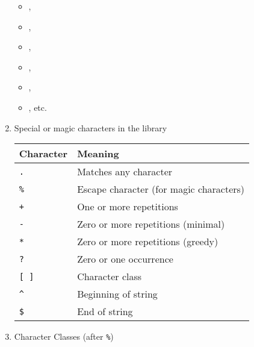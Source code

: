 \begin{enumerate}[label=(\alph*)]
\begin{itemize}

\item {},
\item {},

\item {},

\item {},

\item {},

\item {}, etc.
\end{itemize}



\item Special or magic characters in the library \\

\begin{center}
  \begin{tabular}{@{}ll@{}}
  \toprule
  \textbf{Character} & \textbf{Meaning} \\
  \midrule
  \texttt{.} & Matches any character \\
  \texttt{\%} & Escape character (for magic characters) \\
  \texttt{+} & One or more repetitions \\
  \texttt{-} & Zero or more repetitions (minimal) \\
  \texttt{*} & Zero or more repetitions (greedy) \\
  \texttt{?} & Zero or one occurrence \\
  \texttt{[ ]} & Character class \\
  \texttt{\^{}} & Beginning of string \\
  \texttt{\$} & End of string \\
  \bottomrule
  \end{tabular}
\end{center}


\item Character Classes (after \texttt{\%})


\end{enumerate}
